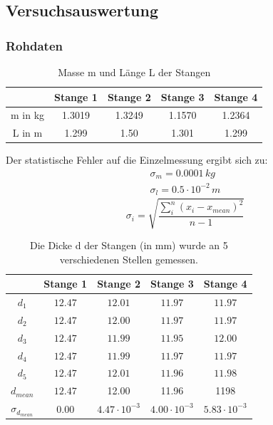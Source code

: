 \documentclass[12pt,a4paper]{article}
\begin{document}
\subsection{Versuchsauswertung}

\subsubsection{Rohdaten}

\begin{table}[H]\centering
\caption{Masse m und Länge L der Stangen}
\begin{tabular}{c|cccc}
& Stange 1 & Stange 2 & Stange 3 & Stange 4 \\ 
\hline
m in kg & 1.3019 & 1.3249 & 1.1570 & 1.2364 \\ 
L in m & 1.299  & 1.50 & 1.301 & 1.299 \\ 
\end{tabular} 
\end{table}
Der statistische Fehler auf die Einzelmessung ergibt sich zu:
\begin{align*}
\sigma_m=0.0001\,kg\\
\sigma_l=0.5\cdot10^{-2}\,m
\end{align*}
\begin{equation}
\sigma_i=\sqrt{\frac{\sum_i^n(x_i-x_{mean})^2}{n-1}}
\end{equation}

\begin{table}[H]\centering
\caption{Die Dicke d der Stangen (in mm) wurde an 5 verschiedenen Stellen gemessen.}
\begin{tabular}{c|cccc}
 & Stange 1 & Stange 2 & Stange 3 & Stange 4 \\ 
 \hline
$d_1$ & $12.47$ & $12.01$ & $11.97$ & $11.97$ \\ 
$d_2$ & $12.47$ & $12.00$ & $11.97$ & $11.97$ \\ 
$d_3$ & $12.47$ & $11.99$ & $11.95$ & $12.00$ \\ 
$d_4$ & $12.47$ & $11.99$ & $11.97$ & $11.97$ \\ 
$d_5$ & $12.47$ & $12.01$ & $11.96$ & $11.98$ \\ 
\hline
$d_{mean}$ & $12.47$ & 12.00 & 11.96 & 1198 \\ 
$\sigma_{d_{mean}}$ & $0.00$ & $4.47\cdot 10^{-3}$ & $4.00\cdot 10^{-3}$ & $5.83\cdot 10^{-3}$ \\ 
\end{tabular} 
\end{table}
\end{document}
